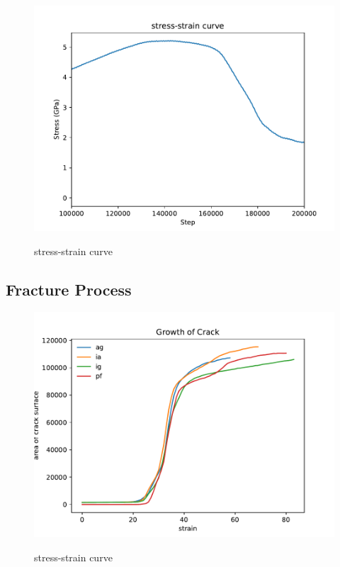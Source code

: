 \documentclass[final,5p,times,twocolumn]{elsarticle}
\begin{document}
\begin{figure}
	\centering
	\includegraphics[width=1\linewidth]{img/agline}
	\label{fig:agline}
	\caption{stress-strain curve}
\end{figure}

\subsection{Fracture Process}
\begin{figure}
	\centering
	\includegraphics[width=1\linewidth]{img/crack_surf}
	\label{fig:agline}
	\caption{stress-strain curve}
\end{figure}

%

\end{document}
